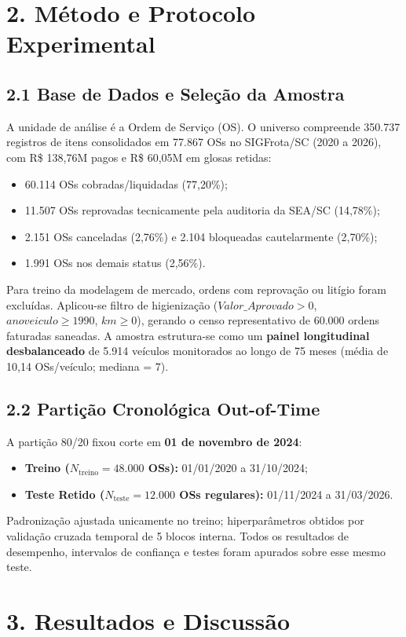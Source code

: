 \documentclass[10pt,a4paper,journal]{article}
\begin{document}
\section{2. Método e Protocolo Experimental}
\subsection{2.1 Base de Dados e Seleção da Amostra}
A unidade de análise é a Ordem de Serviço (OS). O universo compreende 350.737 registros de itens consolidados em 77.867 OSs no SIGFrota/SC (2020 a 2026), com R\$ 138,76M pagos e R\$ 60,05M em glosas retidas:
\begin{itemize}
    \item 60.114 OSs cobradas/liquidadas (77,20\%);
    \item 11.507 OSs reprovadas tecnicamente pela auditoria da SEA/SC (14,78\%);
    \item 2.151 OSs canceladas (2,76\%) e 2.104 bloqueadas cautelarmente (2,70\%);
    \item 1.991 OSs nos demais status (2,56\%).
\end{itemize}
Para treino da modelagem de mercado, ordens com reprovação ou litígio foram excluídas. Aplicou-se filtro de higienização ($Valor\_Aprovado > 0$, $anoveiculo \ge 1990$, $km \ge 0$), gerando o censo representativo de 60.000 ordens faturadas saneadas. A amostra estrutura-se como um \textbf{painel longitudinal desbalanceado} de 5.914 veículos monitorados ao longo de 75 meses (média de 10,14 OSs/veículo; mediana = 7).

\subsection{2.2 Partição Cronológica Out-of-Time}
A partição 80/20 fixou corte em \textbf{01 de novembro de 2024}:
\begin{itemize}
    \item \textbf{Treino ($N_{\text{treino}} = 48.000$ OSs):} 01/01/2020 a 31/10/2024;
    \item \textbf{Teste Retido ($N_{\text{teste}} = 12.000$ OSs regulares):} 01/11/2024 a 31/03/2026.
\end{itemize}
Padronização ajustada unicamente no treino; hiperparâmetros obtidos por validação cruzada temporal de 5 blocos interna. Todos os resultados de desempenho, intervalos de confiança e testes foram apurados sobre esse mesmo teste.

\section{3. Resultados e Discussão}
\end{document}
